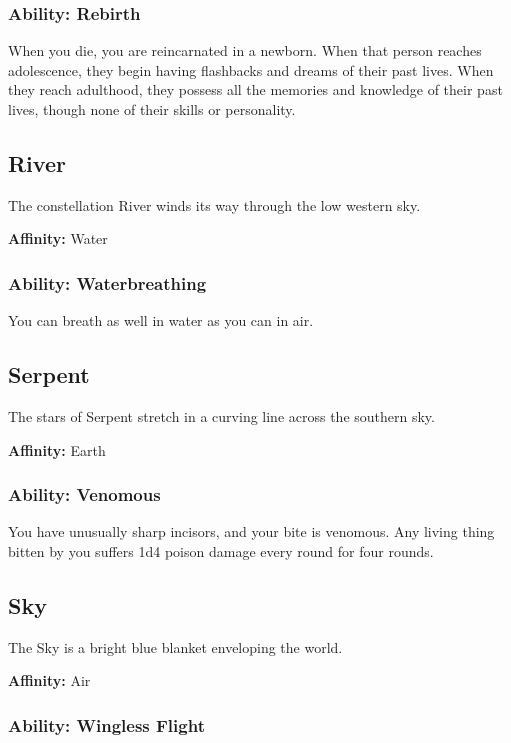 \begin{multicols}{2}
\subsubsection{Ability: Rebirth}

When you die, you are reincarnated in a newborn. When that person
reaches adolescence, they begin having flashbacks and dreams of their
past lives. When they reach adulthood, they possess all the memories
and knowledge of their past lives, though none of their skills or personality.

\subsection{River}

The constellation River winds its way through the low western sky.

\textbf{Affinity:} Water

\subsubsection{Ability: Waterbreathing}

You can breath as well in water as you can in air.

\subsection{Serpent}

The stars of Serpent stretch in a curving line across the
southern sky.

\textbf{Affinity:} Earth

\subsubsection{Ability: Venomous}

You have unusually sharp incisors, and your bite is venomous. Any
living thing bitten by you suffers 1d4 poison damage every round for
four rounds.

\subsection{Sky}

The Sky is a bright blue blanket enveloping the world.

\textbf{Affinity:} Air

\subsubsection{Ability: Wingless Flight}


\end{multicols}
